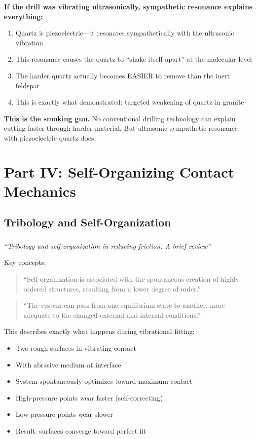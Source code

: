 \documentclass[11pt]{article}
\begin{document}
\textbf{If the drill was vibrating ultrasonically, sympathetic resonance explains everything:}

\begin{enumerate}
    \item Quartz is piezoelectric---it resonates sympathetically with the ultrasonic vibration
    \item This resonance causes the quartz to ``shake itself apart'' at the molecular level
    \item The harder quartz actually becomes EASIER to remove than the inert feldspar
    \item This is exactly what \citet{Saksala2023} demonstrated: targeted weakening of quartz in granite
\end{enumerate}

\textbf{This is the smoking gun.} No conventional drilling technology can explain cutting faster through harder material. But ultrasonic sympathetic resonance with piezoelectric quartz does.

\section{Part IV: Self-Organizing Contact Mechanics}

\subsection{Tribology and Self-Organization}

\subsubsection{\citet{Assenova2022}}
\textit{``Tribology and self-organization in reducing friction: A brief review''}

Key concepts:
\begin{quote}
``Self-organization is associated with the spontaneous creation of highly ordered structures, resulting from a lower degree of order.''
\end{quote}

\begin{quote}
``The system can pass from one equilibrium state to another, more adequate to the changed external and internal conditions.''
\end{quote}

This describes exactly what happens during vibrational fitting:
\begin{itemize}
    \item Two rough surfaces in vibrating contact
    \item With abrasive medium at interface
    \item System spontaneously optimizes toward maximum contact
    \item High-pressure points wear faster (self-correcting)
    \item Low-pressure points wear slower
    \item Result: surfaces converge toward perfect fit
\end{itemize}
\end{document}
